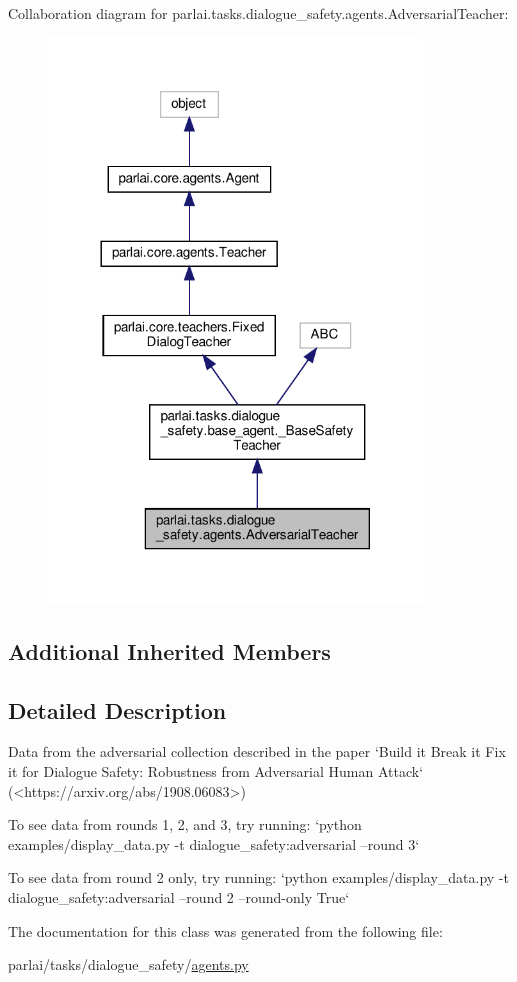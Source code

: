 Collaboration diagram for parlai.\+tasks.\+dialogue\+\_\+safety.\+agents.\+Adversarial\+Teacher\+:
\nopagebreak
\begin{figure}[H]
\begin{center}
\leavevmode
\includegraphics[width=281pt]{classparlai_1_1tasks_1_1dialogue__safety_1_1agents_1_1AdversarialTeacher__coll__graph}
\end{center}
\end{figure}
\subsection*{Additional Inherited Members}


\subsection{Detailed Description}
\begin{DoxyVerb}Data from the adversarial collection described in the paper `Build it Break it Fix
it for Dialogue Safety: Robustness from Adversarial Human Attack`
(<https://arxiv.org/abs/1908.06083>)

To see data from rounds 1, 2, and 3, try running:
`python examples/display_data.py -t dialogue_safety:adversarial --round 3`

To see data from round 2 only, try running:
`python examples/display_data.py -t dialogue_safety:adversarial --round 2
 --round-only True`
\end{DoxyVerb}
 

The documentation for this class was generated from the following file\+:\begin{DoxyCompactItemize}
\item 
parlai/tasks/dialogue\+\_\+safety/\hyperlink{parlai_2tasks_2dialogue__safety_2agents_8py}{agents.\+py}\end{DoxyCompactItemize}
